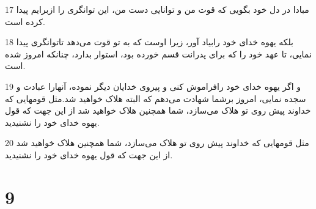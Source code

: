 \par 17 مبادا در دل خود بگویی که قوت من و توانایی دست من، این توانگری را ازبرایم پیدا کرده است.
\par 18 بلکه یهوه خدای خود رابیاد آور، زیرا اوست که به تو قوت می‌دهد تاتوانگری پیدا نمایی، تا عهد خود را که برای پدرانت قسم خورده بود، استوار بدارد، چنانکه امروز شده است.
\par 19 و اگر یهوه خدای خود رافراموش کنی و پیروی خدایان دیگر نموده، آنهارا عبادت و سجده نمایی، امروز برشما شهادت می‌دهم که البته هلاک خواهید شد.مثل قومهایی که خداوند پیش روی تو هلاک می‌سازد، شما همچنین هلاک خواهید شد از این جهت که قول یهوه خدای خود را نشنیدید.
\par 20 مثل قومهایی که خداوند پیش روی تو هلاک می‌سازد، شما همچنین هلاک خواهید شد از این جهت که قول یهوه خدای خود را نشنیدید.
 
\chapter{9}

